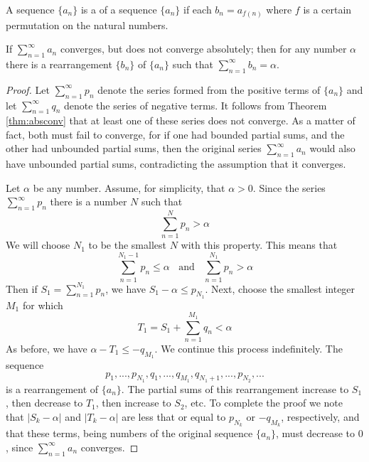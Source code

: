 \documentclass[12pt, a4paper, oneside, openright, titlepage]{book}
\begin{document}
\begin{defn}
    A sequence $\{a_n\}$ is a  of a sequence $\{a_n\}$ if each $b_n = a_{f(n)}$ where $f$ is a certain permutation on the natural numbers.
\end{defn}



\begin{thm}
    If $\sum\limits_{n=1}^{\infty}a_n$ converges, but does not converge absolutely; then for any number $\alpha$ there is a rearrangement $\{b_n\}$ of $\{a_n\}$ such that $\sum\limits_{n=1}^{\infty}b_n = \alpha$.
\end{thm}
\begin{proof}
    Let $\sum\limits_{n=1}^{\infty}p_n$ denote the series formed from the positive terms of $\{a_n\}$ and let $\sum\limits_{n=1}^{\infty}q_n$ denote the series of negative terms. It follows from Theorem \ref{thm:absconv} that at least one of these series does not converge. As a matter of fact, both must fail to converge, for if one had bounded partial sums, and the other had unbounded partial sums, then the original series $\sum\limits_{n=1}^{\infty}a_n$ would also have unbounded partial sums, contradicting the assumption that it converges.

    Let $\alpha$ be any number. Assume, for simplicity, that $\alpha > 0$. Since the series $\sum\limits_{n=1}^{\infty}p_n$ there is a number $N$ such that \begin{equation*}
        \sum\limits_{n=1}^Np_n > \alpha
    \end{equation*}
    We will choose $N_1$ to be the smallest $N$ with this property. This means that \begin{equation*}
        \sum\limits_{n=1}^{N_1-1}p_n \leq \alpha\;\;\text{ and }\;\;\sum\limits_{n=1}^{N_1}p_n > \alpha
    \end{equation*}
    Then if $S_1 = \sum\limits_{n=1}^{N_1}p_n$, we have $S_1 - \alpha \leq p_{N_1}$. Next, choose the smallest integer $M_1$ for which \begin{equation*}
        T_1 = S_1 + \sum\limits_{n=1}^{M_1}q_n < \alpha
    \end{equation*}
    As before, we have $\alpha - T_1 \leq -q_{M_1}$. We continue this process indefinitely. The sequence \begin{equation*}
        p_1,...,p_{N_1},q_1,...,q_{M_1},q_{N_1+1},...,p_{N_2},...
    \end{equation*}
    is a rearrangement of $\{a_n\}$. The partial sums of this rearrangement increase to $S_1$, then decrease to $T_1$, then increase to $S_2$, etc. To complete the proof we note that $|S_k -\alpha|$ and $|T_k - \alpha|$ are less that or equal to $p_{N_k}$ or $-q_{M_k}$, respectively, and that these terms, being numbers of the original sequence $\{a_n\}$, must decrease to $0$, since $\sum\limits_{n=1}^{\infty}a_n$ converges.
\end{proof}
\end{document}
